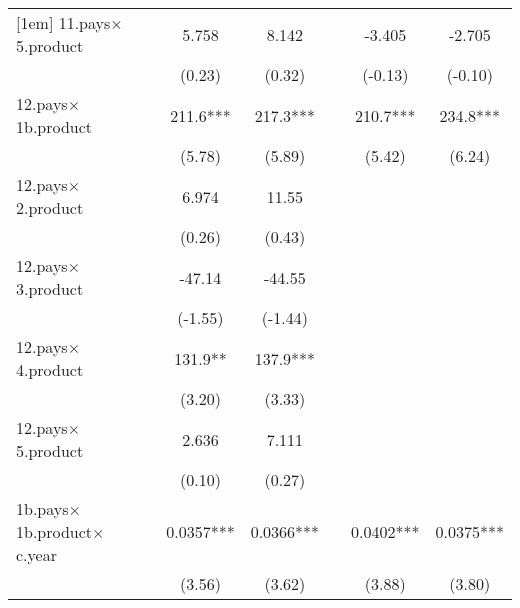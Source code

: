{\begin{tabular}{l*{6}{c}}
[1em]
11.pays$\times$5.product   &                     &       5.758         &       8.142         &                     &      -3.405         &      -2.705         \\
                    &                     &      (0.23)         &      (0.32)         &                     &     (-0.13)         &     (-0.10)         \\
[1em]
12.pays$\times$1b.product  &                     &       211.6***&       217.3***&                     &       210.7***&       234.8***\\
                    &                     &      (5.78)         &      (5.89)         &                     &      (5.42)         &      (6.24)         \\
[1em]
12.pays$\times$2.product   &                     &       6.974         &       11.55         &                     &                     &                     \\
                    &                     &      (0.26)         &      (0.43)         &                     &                     &                     \\
[1em]
12.pays$\times$3.product   &                     &      -47.14         &      -44.55         &                     &                     &                     \\
                    &                     &     (-1.55)         &     (-1.44)         &                     &                     &                     \\
[1em]
12.pays$\times$4.product   &                     &       131.9** &       137.9***&                     &                     &                     \\
                    &                     &      (3.20)         &      (3.33)         &                     &                     &                     \\
[1em]
12.pays$\times$5.product   &                     &       2.636         &       7.111         &                     &                     &                     \\
                    &                     &      (0.10)         &      (0.27)         &                     &                     &                     \\
[1em]
1b.pays$\times$1b.product$\times$c.year&                     &      0.0357***&      0.0366***&                     &      0.0402***&      0.0375***\\
                    &                     &      (3.56)         &      (3.62)         &                     &      (3.88)         &      (3.80)         \\

\end{tabular}}
